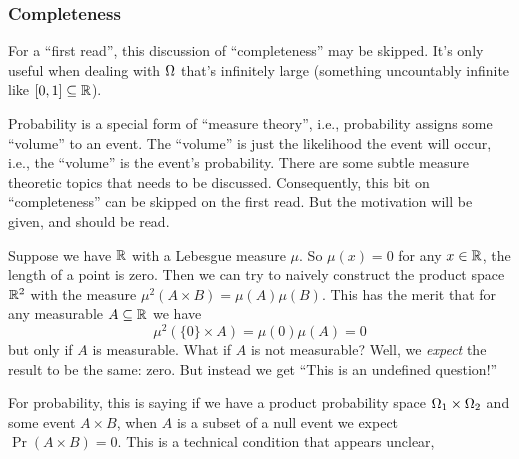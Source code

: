 \subsubsection{Completeness}
For a ``first read'', this discussion of ``completeness'' may be
skipped. It's only useful when dealing with $\Omega$ that's
infinitely large (something uncountably infinite like $[0,1]\subseteq\mathbb{R}$).

\M
Probability is a special form of ``measure theory'', i.e., probability
assigns some ``volume'' to an event. The ``volume'' is just the
likelihood the event will occur, i.e., the ``volume'' is the event's
probability. There are some subtle measure theoretic topics that needs
to be discussed. Consequently, this bit on ``completeness'' can be
skipped on the first read. But the motivation will be given, and should
be read.

Suppose we have $\mathbb{R}$ with a Lebesgue measure $\mu$. So $\mu(x)=0$ for
any $x\in\mathbb{R}$, the length of a point is zero. Then we can try to naively
construct the product space $\mathbb{R}^2$ with the measure
$\mu^{2}(A\times B)=\mu(A)\mu(B)$. This has the merit that for any
measurable $A\subseteq\mathbb{R}$ we have
\begin{equation}
\mu^{2}(\{0\}\times A)=\mu(0)\mu(A)=0
\end{equation}
but only if $A$ is measurable. What if $A$ is not measurable? Well,
we \emph{expect} the result to be the same: zero. But instead we get
``This is an undefined question!''

\M
For probability, this is saying if we have a product probability space
$\Omega_1\times\Omega_2$ and some event $A\times B$, when
$A$ is a subset of a null event we expect $\Pr(A\times B)=0$. This is a
technical condition that appears unclear,


